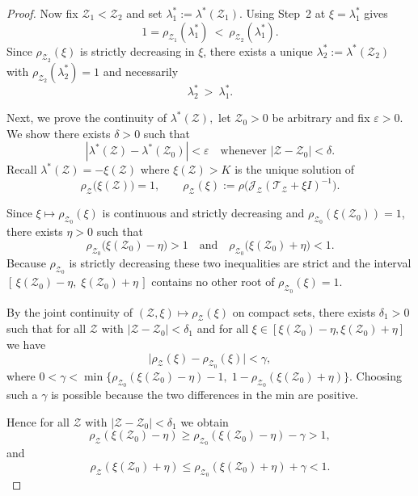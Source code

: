 \documentclass[a4paper,11pt]{amsart}
\theoremstyle{definition}
\numberwithin{equation}{section}
\theoremstyle{definition}
\begin{document}
\begin{proof}
Now fix $\mathcal Z_1<\mathcal Z_2$ and set $\lambda_1^\ast:=\lambda^\ast(\mathcal Z_1)$.
Using Step~2 at $\xi=\lambda_1^\ast$ gives
\[
1=\rho_{\mathcal Z_1}(\lambda_1^\ast)\ <\ \rho_{\mathcal Z_2}(\lambda_1^\ast).
\]
Since $\rho_{\mathcal Z_2}(\xi)$ is strictly decreasing in $\xi$, there exists a unique
$\lambda_2^\ast:=\lambda^\ast(\mathcal Z_2)$ with
$\rho_{\mathcal Z_2}(\lambda_2^\ast)=1$ and necessarily
\[
\lambda_2^\ast\ >\ \lambda_1^\ast.
\]

\medskip

Next, we prove the continuity of $\lambda^\ast(\mathcal{Z}),$
let $\mathcal Z_0>0$ be arbitrary and fix $\varepsilon>0$. We show there exists $\delta>0$ such that
\[
|\lambda^\ast(\mathcal Z)-\lambda^\ast(\mathcal Z_0)|<\varepsilon
\quad\text{whenever } |\mathcal Z-\mathcal Z_0|<\delta.
\]
Recall $\lambda^\ast(\mathcal Z)=-\xi(\mathcal Z)$ where $\xi(\mathcal Z)>K$ is the unique solution of
\[
\rho_{\mathcal Z}\big(\xi(\mathcal Z)\big)=1,\qquad
\rho_{\mathcal Z}(\xi):=\rho\!\big(\mathscr J_{\mathcal Z}(\mathscr T_{\mathcal Z}+\xi I)^{-1}\big).
\]


Since \(\xi\mapsto\rho_{\mathcal Z_0}(\xi)\) is continuous and strictly decreasing and
\(\rho_{\mathcal Z_0}(\xi(\mathcal Z_0))=1\), there exists \(\eta>0\) such that
\[
\rho_{\mathcal Z_0}\big(\xi(\mathcal Z_0)-\eta\big) > 1 \quad\text{and}\quad
\rho_{\mathcal Z_0}\big(\xi(\mathcal Z_0)+\eta\big) < 1.
\]
Because \(\rho_{\mathcal Z_0}\) is strictly decreasing these two inequalities are strict and the interval
\([\,\xi(\mathcal Z_0)-\eta,\; \xi(\mathcal Z_0)+\eta\,]\) contains no other root of \(\rho_{\mathcal Z_0}(\xi)=1\).


By the joint continuity of \((\mathcal Z,\xi)\mapsto\rho_{\mathcal Z}(\xi)\) on compact sets, there exists
\(\delta_1>0\) such that for all \(\mathcal Z\) with \(|\mathcal Z-\mathcal Z_0|<\delta_1\) and for all
\(\xi\in[\xi(\mathcal Z_0)-\eta,\xi(\mathcal Z_0)+\eta]\) we have
\[
\big|\rho_{\mathcal Z}(\xi)-\rho_{\mathcal Z_0}(\xi)\big| < \gamma,
\]
where \(0<\gamma<\min\{\rho_{\mathcal Z_0}(\xi(\mathcal Z_0)-\eta)-1,\;1-\rho_{\mathcal Z_0}(\xi(\mathcal Z_0)+\eta)\}\).
Choosing such a \(\gamma\) is possible because the two differences in the min are positive.

Hence for all \(\mathcal Z\) with \(|\mathcal Z-\mathcal Z_0|<\delta_1\) we obtain
\[
\rho_{\mathcal Z}(\xi(\mathcal Z_0)-\eta) \ge \rho_{\mathcal Z_0}(\xi(\mathcal Z_0)-\eta)-\gamma > 1,
\]
and
\[
\rho_{\mathcal Z}(\xi(\mathcal Z_0)+\eta) \le \rho_{\mathcal Z_0}(\xi(\mathcal Z_0)+\eta)+\gamma < 1.
\]


\end{proof}
\end{document}
